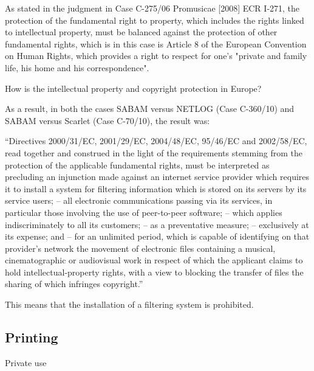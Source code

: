 As stated in the judgment in Case C-275/06 Promusicae [2008] ECR I-271, the protection of the fundamental right to property, which includes the rights linked to intellectual property, must be balanced against the protection of other fundamental rights, which is in this case is Article 8 of the European Convention on Human Rights, which provides a right to respect for one's "private and family life, his home and his correspondence".

How is the intellectual property and copyright protection in Europe?

As a result, in both the cases SABAM versus NETLOG (Case C-360/10) and SABAM versus Scarlet (Case C-70/10), the result was:

“Directives 2000/31/EC, 2001/29/EC, 2004/48/EC, 95/46/EC and 2002/58/EC, read together and construed in the light of the requirements stemming from the protection of the applicable fundamental rights, must be interpreted as precluding an injunction made against an internet service provider which requires it to install a system for filtering information which is stored on its servers by its service users;
–        all electronic communications passing via its services, in particular those involving the use of peer-to-peer software;
–        which applies indiscriminately to all its customers;
–        as a preventative measure;
–        exclusively at its expense; and
–        for an unlimited period,
which is capable of identifying on that provider’s network the movement of electronic files containing a musical, cinematographic or audiovisual work in respect of which the applicant claims to hold intellectual-property rights, with a view to blocking the transfer of files the sharing of which infringes copyright.”

This means that the installation of a filtering system is prohibited. 

\subsection{Printing}

Private use

